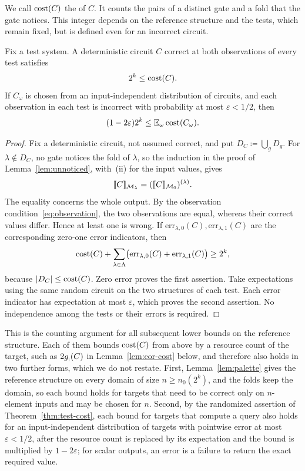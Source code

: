 We call $\operatorname{cost}(C)$ the  of $C$. It counts the pairs of a
distinct gate and a fold that the gate notices. This integer depends on
the reference structure and the tests, which remain fixed, but is
defined even for an incorrect circuit.

\begin{theorem}\label{thm:test-cost}
Fix a test system. A deterministic circuit $C$ correct at both
observations of every test satisfies
\[
 2^k\le\operatorname{cost}(C).
\]
If $C_\omega$ is chosen from an input-independent distribution of circuits,
and each observation in each test is incorrect with probability at most
$\varepsilon<1/2$, then
\[
 (1-2\varepsilon)2^k\le\mathbb E_\omega\operatorname{cost}(C_\omega).
\]
\end{theorem}
\begin{proof}
Fix a deterministic circuit, not assumed correct, and put
$D_C\coloneqq\bigcup_gD_g$. For $\lambda\notin D_C$, no gate notices the
fold of $\lambda$, so the induction in the proof of
Lemma~\ref{lem:unnoticed}, with~(ii) for the input values, gives
\[
 \llbracket C\rrbracket_{\mathcal M_\lambda}=(\llbracket C\rrbracket_{\mathcal M_0})^{(\lambda)}.
\]
The equality concerns the whole output. By the observation
condition~\eqref{eq:observation}, the two observations are equal, whereas
their correct values differ. Hence at least one is wrong. If
$\mathrm{err}_{\lambda,0}(C),\mathrm{err}_{\lambda,1}(C)$ are the
corresponding zero-one error indicators, then
\[
 \operatorname{cost}(C)+\sum_{\lambda\in\Lambda}
   \bigl(\mathrm{err}_{\lambda,0}(C)+\mathrm{err}_{\lambda,1}(C)\bigr)\ge2^k,
\]
because $|D_C|\le\operatorname{cost}(C)$. Zero error proves the first assertion.
Take expectations using the same random circuit on the two structures
of each test. Each error indicator has expectation at most $\varepsilon$,
which proves the second assertion. No independence among the tests or
their errors is required.
\end{proof}

This is the counting argument for all subsequent lower bounds on the
reference structure. Each of them bounds $\operatorname{cost}(C)$ from above by a
resource count of the target, such as $2g_{;}(C)$ in
Lemma~\ref{lem:cor-cost} below, and therefore also holds in two further
forms, which we do not restate. First, Lemma~\ref{lem:palette} gives the
reference structure on every domain of size $n\ge n_0(2^k)$, and the
folds keep the domain, so each bound holds for targets that need to be
correct only on $n$-element inputs and may be chosen for $n$. Second, by
the randomized assertion of Theorem~\ref{thm:test-cost}, each bound for
targets that compute a query also holds for an input-independent
distribution of targets with pointwise error at most
$\varepsilon<1/2$, after the resource count is replaced by its
expectation and the bound is multiplied by $1-2\varepsilon$; for scalar
outputs, an error is a failure to return the exact required value.

